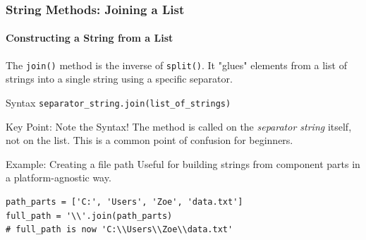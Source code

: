 \documentclass{beamer}
\begin{document}
\begin{frame}[fragile]
    \frametitle{String Methods: Joining a List}
    \framesubtitle{Constructing a String from a List}

    The \texttt{join()} method is the inverse of \texttt{split()}. It "glues" elements from a list of strings into a single string using a specific separator.

    \vspace{1em}

    \begin{block}{Syntax}
        \texttt{separator\_string.join(list\_of\_strings)}
    \end{block}

    \begin{alertblock}{Key Point: Note the Syntax!}
        The method is called on the \textit{separator string} itself, not on the list. This is a common point of confusion for beginners.
    \end{alertblock}

    \begin{block}{Example: Creating a file path}
        Useful for building strings from component parts in a platform-agnostic way.
        \begin{verbatim}
path_parts = ['C:', 'Users', 'Zoe', 'data.txt']
full_path = '\\'.join(path_parts)
# full_path is now 'C:\\Users\\Zoe\\data.txt'
        \end{verbatim}
    \end{block}
\end{frame}
\end{document}
